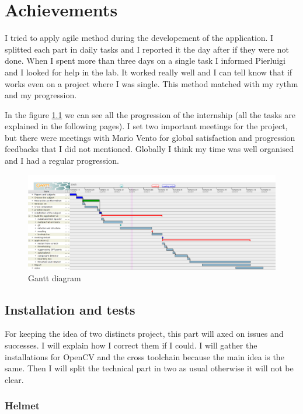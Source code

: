 \chapter{Achievements}
\par I tried to apply agile method during the developement of the application. I splitted each part in daily tasks and I reported it the day after if they were not done. When I spent more than three days on a single task I informed Pierluigi and I looked for help in the lab. It worked really well and I can tell know that if works even on a project where I was single. This method matched with my rythm and my progression.
\par In the figure \ref{gantt} we can see all the progression of the internship (all the tasks are explained in the following pages). I set two important meetings for the project, but there were meetings with Mario Vento for global satisfaction and progression feedbacks that I did not mentioned. Globally I think my time was well organised and I had a regular progression.
	\begin{figure}[h]
		\begin{center}
			\includegraphics[width=15cm]{images_not_compressed/gantt.png}
			\caption{Gantt diagram}
			\label{gantt}	
		\end{center}
	\end{figure}
	\section{Installation and tests}
	

\par For keeping the idea of two distincts project, this part will axed on issues and successes. I will explain how I correct them if I could. I will gather the installations for OpenCV and the cross toolchain because the main idea is the same. Then I will split the technical part in two as usual otherwise it will not be clear.


	\subsection{Helmet}
